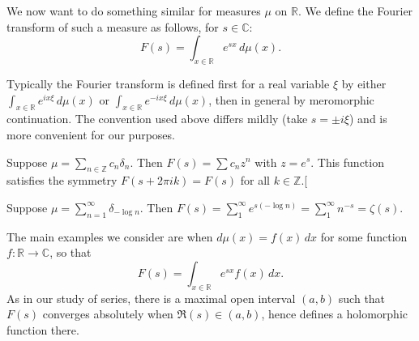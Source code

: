 \documentclass[reqno]{amsart}  \numberwithin{theorem}{section} \numberwithin{equation}{section}
\begin{document}
We now want to do something similar for measures $\mu$ on $\mathbb{R}$. We define the Fourier transform of such a measure as follows, for $s \in \mathbb{C}$:
\begin{equation*}
  F(s) = \int_{x \in \mathbb{R} } e^{s x } \, d \mu (x).
\end{equation*}
\begin{remark}
  Typically the Fourier transform is defined first for a real variable $\xi$ by either $\int_{x \in \mathbb{R} } e^{i x \xi } \, d \mu(x)$ or $\int_{x \in \mathbb{R} } e^{-i x \xi } \, d \mu(x)$, then in general by meromorphic continuation.  The convention used above differs mildly (take $s = \pm i \xi$) and is more convenient for our purposes.
\end{remark}
\begin{example}
  Suppose $\mu = \sum_{n \in \mathbb{Z} } c_n \delta_n$.  Then $F (s) = \sum c_n z^n$ with $z = e^s$.  This function satisfies the symmetry $F (s + 2 \pi i k) = F (s)$ for all $k \in \mathbb{Z}$.[\]
\end{example}
\begin{example}
  Suppose $\mu = \sum_{n =1 }^\infty \delta_{- \log n}$.  Then $F (s) = \sum_1^\infty e^{s (- \log n )} = \sum_1^\infty n^{- s} = \zeta(s)$.
\end{example}
The main examples we consider are when $d \mu (x) = f (x) \, d x$ for some function $f : \mathbb{R} \rightarrow \mathbb{C}$, so that
\begin{equation*}
  F (s) = \int_{x \in \mathbb{R} } e^{s x } f (x) \, d x.
\end{equation*}
As in our study of series, there is a maximal open interval $(a,b)$ such that $F (s)$ converges absolutely when $\Re(s) \in (a,b)$, hence defines a holomorphic function there.
\end{document}
